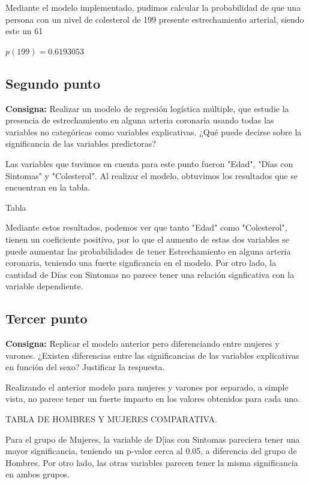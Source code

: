 \documentclass{article} %
\begin{document}
Mediante el modelo implementado, pudimos calcular la probabilidad de que una persona con un nivel de colesterol de 199 presente estrechamiento arterial, siendo este un 61%

$p(199)=0.6193053$



\subsection{Segundo punto}

\textbf{Consigna:} Realizar un modelo de regresión logística múltiple, que estudie la presencia de estrechamiento en alguna arteria coronaria usando todas las variables no categóricas como variables explicativas. ¿Qué puede decirse sobre la significancia de las variables predictoras?

Las variables que tuvimos en cuenta para este punto fueron "Edad", "Días con Sintomas" y "Colesterol". Al realizar el modelo, obtuvimos los resultados que se encuentran en la tabla.

Tabla

Mediante estos resultados, podemos ver que tanto "Edad" como "Colesterol", tienen un coeficiente positivo, por lo que el aumento de estas dos variables se puede aumentar las probabilidades de tener Estrechamiento en alguna arteria coronaria, teniendo una fuerte signficancia en el modelo. Por otro lado, la cantidad de Días con Sintomas no parece tener una relación signficativa con la variable dependiente. 


\subsection{Tercer punto}

\textbf{Consigna:} Replicar el modelo anterior pero diferenciando entre mujeres y varones. ¿Existen diferencias entre las significancias de las variables explicativas en función del sexo? Justificar la respuesta.

Realizando el anterior modelo para mujeres y varones por separado, a simple vista, no parece tener un fuerte impacto en los valores obtenidos para cada uno. 

TABLA DE HOMBRES Y MUJERES COMPARATIVA.

Para el grupo de Mujeres, la variable de D[ias con Sintomas pareciera tener una mayor significancia, teniendo un p-valor cerca al 0.05, a diferencia del grupo de Hombres. Por otro lado, las otras variables parecen tener la misma significancia en ambos grupos. 
\end{document}
